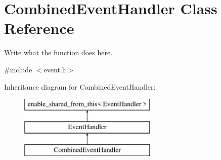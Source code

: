 \hypertarget{classCombinedEventHandler}{\section{Combined\+Event\+Handler Class Reference}
\label{classCombinedEventHandler}
}


Write what the function does here.  




{\ttfamily \#include $<$event.\+h$>$}

Inheritance diagram for Combined\+Event\+Handler\+:\begin{figure}[H]
\begin{center}
\leavevmode
\includegraphics[height=3.000000cm]{classCombinedEventHandler}
\end{center}
\end{figure}
